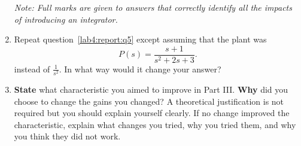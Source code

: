 \begin{deliverable}[label={lab4:report}]
\begin{enumerate}[label={(\arabic*)}]
{      \emph{Note: Full marks are given to answers that correctly identify all the impacts of introducing an integrator.}
      \label{lab4:report:q5}
    }
    \item{%
      Repeat question~\ref{lab4:report:q5} except assuming that the plant was
      \[
        P(s) = \frac{s + 1}{s^2 + 2 s + 3}.
      \]
      instead of \(\frac{1}{s^2}.\)
      In what way would it change your answer?
      \label{lab4:report:q6}
    }
    \item{%
      \textbf{State} what characteristic you aimed to improve in Part III.
      \textbf{Why} did you choose to change the gains you changed?
      A theoretical justification is not required but you should explain yourself clearly.
      If no change improved the characteristic, explain what changes you tried, why you tried them, and why you think they did not work.
      \label{lab4:report:q7}
    }
  \end{enumerate}
\end{deliverable}

